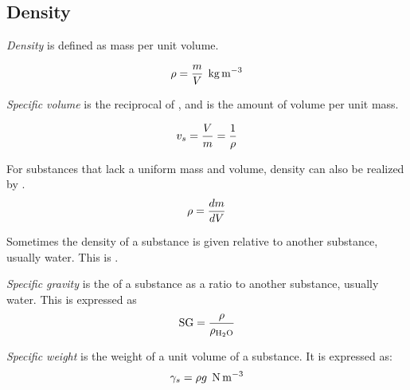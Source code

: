 \subsection{Density}\label{subsec:Density}
\begin{definition}[Density]\label{def:Density}
  \emph{Density} is defined as mass per unit volume.

  \begin{equation}\label{eq:Density}
    \rho = \frac{m}{V} \:\: \si{\kilo\gram\per\meter\cubed}
  \end{equation}
\end{definition}

\begin{definition}\label{def:Specific_Volume}
  \emph{Specific volume} is the reciprocal of , and is the amount of volume per unit mass.

  \begin{equation}\label{eq:Specific_Volume}
    v_{s} = \frac{V}{m} = \frac{1}{\rho}
  \end{equation}
\end{definition}

For substances that lack a uniform mass and volume, density can also be realized by .
\begin{equation}\label{eq:Differential_Density}
  \rho = \frac{d m}{d V}
\end{equation}

Sometimes the density of a substance is given relative to another substance, usually water.
This is .
\begin{definition}\label{def:Specific_Gravity}
  \emph{Specific gravity} is the  of a substance as a ratio to another substance, usually water.
  This is expressed as
  \begin{equation}\label{eq:Specific_Gravity}
    \mathrm{SG} = \frac{\rho}{\rho_{\mathrm{H_{2}O}}}
  \end{equation}
\end{definition}

\begin{definition}\label{def:Specific_Weight}
  \emph{Specific weight} is the weight of a unit volume of a substance.
  It is expressed as:
  \begin{equation}\label{eq:Specific_Weight}
    \gamma_{s} = \rho g \:\: \si{\newton\per\meter\cubed}
  \end{equation}
\end{definition}

